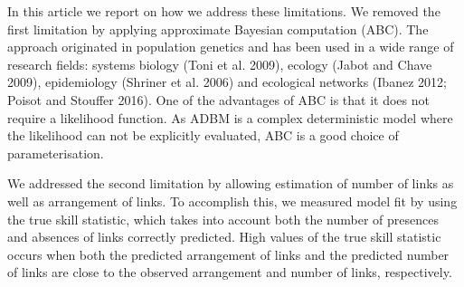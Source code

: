 \documentclass{article}
\begin{document}
In this article we report on how we address these limitations. We
removed the first limitation by applying approximate Bayesian
computation (ABC). The approach originated in population genetics and
has been used in a wide range of research fields: systems biology (Toni
et al. 2009), ecology (Jabot and Chave 2009), epidemiology (Shriner et
al. 2006) and ecological networks (Ibanez 2012; Poisot and Stouffer
2016). One of the advantages of ABC is that it does not require a
likelihood function. As ADBM is a complex deterministic model where the
likelihood can not be explicitly evaluated, ABC is a good choice of
parameterisation.

We addressed the second limitation by allowing estimation of number of
links as well as arrangement of links. To accomplish this, we measured
model fit by using the true skill statistic, which takes into account
both the number of presences and absences of links correctly predicted.
High values of the true skill statistic occurs when both the predicted
arrangement of links and the predicted number of links are close to the
observed arrangement and number of links, respectively.
\end{document}
